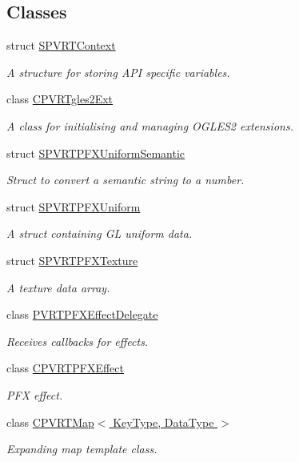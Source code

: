 \subsection*{Classes}
\begin{DoxyCompactItemize}
\item 
struct \hyperlink{struct_s_p_v_r_t_context}{S\+P\+V\+R\+T\+Context}
\begin{DoxyCompactList}\small\item\em A structure for storing A\+P\+I specific variables. \end{DoxyCompactList}\item 
class \hyperlink{class_c_p_v_r_tgles2_ext}{C\+P\+V\+R\+Tgles2\+Ext}
\begin{DoxyCompactList}\small\item\em A class for initialising and managing O\+G\+L\+E\+S2 extensions. \end{DoxyCompactList}\item 
struct \hyperlink{struct_s_p_v_r_t_p_f_x_uniform_semantic}{S\+P\+V\+R\+T\+P\+F\+X\+Uniform\+Semantic}
\begin{DoxyCompactList}\small\item\em Struct to convert a semantic string to a number. \end{DoxyCompactList}\item 
struct \hyperlink{struct_s_p_v_r_t_p_f_x_uniform}{S\+P\+V\+R\+T\+P\+F\+X\+Uniform}
\begin{DoxyCompactList}\small\item\em A struct containing G\+L uniform data. \end{DoxyCompactList}\item 
struct \hyperlink{struct_s_p_v_r_t_p_f_x_texture}{S\+P\+V\+R\+T\+P\+F\+X\+Texture}
\begin{DoxyCompactList}\small\item\em A texture data array. \end{DoxyCompactList}\item 
class \hyperlink{class_p_v_r_t_p_f_x_effect_delegate}{P\+V\+R\+T\+P\+F\+X\+Effect\+Delegate}
\begin{DoxyCompactList}\small\item\em Receives callbacks for effects. \end{DoxyCompactList}\item 
class \hyperlink{class_c_p_v_r_t_p_f_x_effect}{C\+P\+V\+R\+T\+P\+F\+X\+Effect}
\begin{DoxyCompactList}\small\item\em P\+F\+X effect. \end{DoxyCompactList}\item 
class \hyperlink{singleton_c_p_v_r_t_map}{C\+P\+V\+R\+T\+Map$<$ Key\+Type, Data\+Type $>$}
\begin{DoxyCompactList}\small\item\em Expanding map template class. \end{DoxyCompactList}\end{DoxyCompactItemize}
